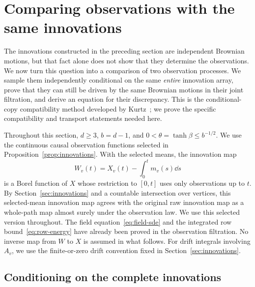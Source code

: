 \section{Comparing observations with the same innovations}
\label{sec:coupling}

The innovations constructed in the preceding section are independent
Brownian motions, but that fact alone does not show that they determine
the observations. We now turn this question into a comparison of two
observation processes. We sample them independently conditional on the
same \emph{entire} innovation array, prove that they can still be driven
by the same Brownian motions in their joint filtration, and derive an
equation for their discrepancy. This is the conditional-copy
compatibility method developed by Kurtz~\cite{Kurtz2014}; we prove the
specific compatibility and transport statements needed here.

Throughout this section, $d\ge3$, $b=d-1$, and
$0<\theta=\tanh\beta\le b^{-1/2}$. We use the continuous causal
observation functions selected in Proposition~\ref{prop:innovations}.
With the selected means, the innovation map
\[
 W_v(t)=X_v(t)-\int_0^t m_v(s)\dd s
\]
is a Borel function of $X$ whose restriction to $[0,t]$ uses only
observations up to $t$. By Section~\ref{sec:innovations} and a countable
intersection over vertices, this selected-mean innovation map agrees
with the original raw innovation map as a whole-path map almost surely
under the observation law. We use this selected version throughout.
The field equation~\eqref{eq:field-sde} and
the integrated row bound~\eqref{eq:row-energy} have already been
proved in the observation filtration. No inverse map from $W$ to $X$
is assumed in what follows.
For drift integrals involving $A_v$, we use the finite-or-zero drift
convention fixed in Section~\ref{sec:innovations}.

\subsection{Conditioning on the complete innovations}

